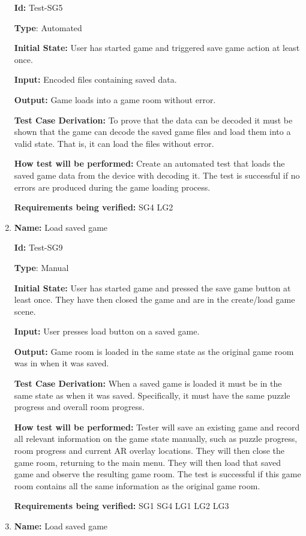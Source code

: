 \documentclass[12pt, titlepage]{article}
\begin{document}
\begin{enumerate}
\textbf{Id:} Test-SG5

\textbf{Type}: Automated

\textbf{Initial State:} User has started game and triggered save game action at least once.

\textbf{Input:} Encoded files containing saved data.

\textbf{Output:} Game loads into a game room without error.

\textbf{Test Case Derivation:}
To prove that the data can be decoded it must be shown that the game can decode the saved game files and load them into a valid state. That is, it can load the files without error.

\textbf{How test will be performed:}
Create an automated test that loads the saved game data from the device with decoding it. The test is successful if no errors are produced during the game loading process.

\textbf{Requirements being verified: } SG4 LG2

\item{\textbf{Name:} Load saved game}

\textbf{Id:} Test-SG9

\textbf{Type}: Manual

\textbf{Initial State:} User has started game and pressed the save game button at least once. They have then closed the game and are in the create/load game scene. 

\textbf{Input:} User presses load button on a saved game.

\textbf{Output:} Game room is loaded in the same state as the original game room was in when it was saved.

\textbf{Test Case Derivation:}
When a saved game is loaded it must be in the same state as when it was saved. Specifically, it must have the same puzzle progress and overall room progress.

\textbf{How test will be performed:}
Tester will save an existing game and record all relevant information on the game state manually, such as puzzle progress, room progress and current AR overlay locations. They will then close the game room, returning to the main menu. They will then load that saved game and observe the resulting game room. The test is successful if this game room contains all the same information as the original game room.

\textbf{Requirements being verified: } SG1 SG4 LG1 LG2 LG3

\item{\textbf{Name:} Load saved game}


\end{enumerate}
\end{document}
